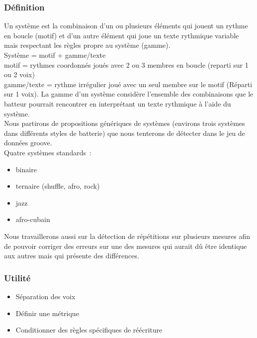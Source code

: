 \subsubsection{Définition}

Un système est la combinaison d’un ou plusieurs éléments qui jouent un rythme en boucle (motif) et d’un autre élément qui joue un texte rythmique variable mais respectant les règles propre au système (gamme).\\

Système = motif + gamme/texte\\
motif = rythmes coordonnés joués avec 2 ou 3 membres en boucle (reparti sur 1 ou 2 voix)\\
gamme/texte = rythme irrégulier joué avec un seul membre sur le motif (Réparti sur 1 voix). La gamme d’un système considère l’ensemble des combinaisons que le batteur pourrait rencontrer en interprétant un texte rythmique à l’aide du système.\\

Nous partirons de propositions génériques de systèmes (environs trois systèmes dans différents styles de batterie) que nous tenterons de détecter dans le jeu de données groove.\\

Quatre systèmes standards :
\begin{itemize}
	\item binaire
	\item ternaire (shuffle, afro, rock)
	\item jazz
	\item afro-cubain\\
\end{itemize}

Nous travaillerons aussi sur la détection de répétitions sur plusieurs mesures afin de pouvoir corriger des erreurs sur une des mesures qui aurait dû être identique aux autres mais qui présente des différences.

\subsubsection{Utilité}
\begin{itemize}
	\item Séparation des voix
	\item Définir une métrique
	\item Conditionner des règles spécifiques de réécriture
\end{itemize}

